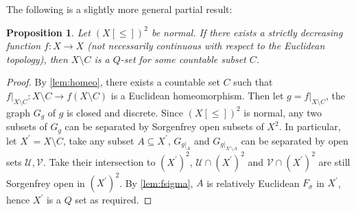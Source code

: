 \documentclass[11pt]{amsart}
\newtheorem{proposition}[theorem]{Proposition}
\theoremstyle{definition}
\theoremstyle{remark}
\newtheorem{claim}[theorem]{Claim}
\newcommand{\Bb}{\mathcal{B}}
\newcommand{\Aa}{\mathcal{A}}
\newcommand{\Vv}{\mathcal{V}}
\newcommand{\Uu}{\mathcal{U}}
\theoremstyle{plain}
\begin{document}
The following is a slightly more general partial result:
\begin{proposition}\label{Prop2.5}
    Let $(X[\leq])^2$ be normal. If there exists a strictly decreasing function $f:X\to X$ (not necessarily continuous with respect to the Euclidean topology), then $X\setminus C$ is a $Q$-set for some countable subset $C$.
\end{proposition}
\begin{proof}
    By \ref{lem:homeo}, there exists a countable set $C$ such that $f|_{X\setminus C}:X\setminus C\to f(X\setminus C)$ is a Euclidean homeomorphism. Then let $g=f|_{X\setminus C}$, the graph $G_g$ of $g$ is closed and discrete. Since $(X[\leq])^2$ is normal, any two subsets of $G_g$ can be separated by Sorgenfrey open subsets of $X^2$. In particular, let $X^\prime=X\setminus C$, take any subset $A\subseteq X^\prime$, $G_{g|_A}$ and $G_{g|_{X\prime\setminus A}}$ can be separated by open sets $\Uu,\Vv$. Take their intersection to $(X^\prime)^2$, $\Uu\cap (X^\prime)^2$ and $\Vv\cap(X^\prime)^2$ are still Sorgenfrey open in $(X^\prime)^2$. By \ref{lem:fsigma}, $A$ is relatively Euclidean $F_\sigma$ in $X^\prime$, hence $X^\prime$ is a $Q$ set as required.
\end{proof}
\end{document}
